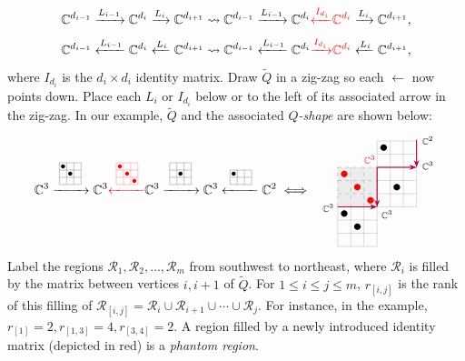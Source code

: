 \documentclass[12pt]{amsart}
\newcommand{\quivermatrix}[3]{
\scalebox{0.8}{
\begin{tikzpicture}[baseline=-0.5ex]
  \draw[line width=.2pt, step=.25cm] (0,0) grid (#1,#2);
  #3
\end{tikzpicture}
}
}
\newcommand{\cell}{.28}
\newcommand{\tile}[5]{%
\begin{scope}[shift={(#1,#2)}]
  \draw[line width =.1pt, step=\cell] (0,0) grid ({#3*\cell},{#4*\cell});
  #5
\end{scope}
}
\newcommand{\phantomtile}[5]{%
\begin{scope}[shift={(#1,#2)}]
  \fill[gray!15] (0,0) rectangle ({#3*\cell},{#4*\cell});
  \draw[gray!70, dashed, step=\cell] (0,0) grid ({#3*\cell},{#4*\cell});
  #5
\end{scope}
}
\newcommand{\dotcell}[2]{%
  \fill ({(#1+.5)*\cell},{(2.5-#2)*\cell}) circle (2pt);
}
\theoremstyle{definition}
\theoremstyle{remark}
\begin{document}
\[{\mathbb C}^{d_{i-1}} \xrightarrow{L_{i-1}} {\mathbb C}^{d_{i}}
 \xrightarrow{L_i}
 {\mathbb C}^{d_{i+1}} \leadsto
 {\mathbb C}^{d_{i-1}} \xrightarrow{L_{i-1}} {\mathbb C}^{d_{i}}
 {\color{red}{\xleftarrow{I_{d_i}}} {\mathbb C}^{d_i}} \xrightarrow{L_{i}} 
 {\mathbb C}^{d_{i+1}}, 
 \]
 \[{\mathbb C}^{d_{i-1}} \xleftarrow{L_{i-1}} {\mathbb C}^{d_{i}}
 \xleftarrow{L_i}
 {\mathbb C}^{d_{i+1}} \leadsto
 {\mathbb C}^{d_{i-1}} \xleftarrow{L_{i-1}} {\mathbb C}^{d_{i}}
 {\color{red}{\xrightarrow{I_{d_i}}} {\mathbb C}^{d_i}} \xleftarrow{L_{i}} 
 {\mathbb C}^{d_{i+1}}, 
 \]
where $I_{d_i}$ is the $d_i\times d_i$ identity matrix. Draw $\widetilde Q$ in a zig-zag 
so  each $\leftarrow$ now points down. Place each $L_i$ or $I_{d_i}$ 
below or to the left of its associated arrow in the zig-zag. In our example, $\widetilde Q$ and the associated
\emph{$Q$-shape} are shown below:
\[
{\mathbb C}^3 
\xrightarrow{
\quivermatrix{.75}{.75}{
  \fill (.125,.625) circle (2pt);
  \fill (.375,.375) circle (2pt);
}}
{\mathbb C}^3 {\color{red}{\xleftarrow{ 
\quivermatrix{.75}{.75}{
 \fill (.125,.625) circle (2pt);
  \fill (.375,.375) circle (2pt);
  \fill (.625,.125) circle (2pt);
 }}}}
 {\mathbb C}^3 \xrightarrow{
 \quivermatrix{.75}{.75}{
  \fill (.375,.375) circle (2pt);
}
 } {\mathbb C}^3
\xleftarrow{
\quivermatrix{.75}{.5}{
  \fill (.125,.375) circle (2pt);
}
} {\mathbb C}^2
\iff
\vcenter{\hbox{
\begin{tikzpicture}[scale=1.3, baseline=-.5ex]

\tile{0}{0}{3}{3}{
  \dotcell{0}{0}
  \dotcell{1}{1}
}

{\color{red}{\phantomtile{0}{.84}{3}{3}{
  \dotcell{0}{0}
  \dotcell{1}{1}
  \dotcell{2}{2}
}}}

\tile{.84}{.84}{3}{3}{
  \dotcell{1}{1}
}

\tile{.84}{1.68}{3}{2}{
  \dotcell{0}{1}
}

\draw[purple, -{Stealth[length=2mm,width=1.5mm]}, thick] (0,.84) -- (.84,.84);
\draw[purple, -{Stealth[length=2mm,width=1.5mm]}, thick] (.84,1.68) -- (.84,.84);
\draw[purple, -{Stealth[length=2mm,width=1.5mm]}, thick] (.84,1.68) -- (1.68,1.68);
\draw[purple, -{Stealth[length=2mm,width=1.5mm]}, thick] (1.68,2.27) -- (1.68,1.68);

\node at (-.2,.82) {\scriptsize ${\mathbb C}^3$};
\node at (1.05,.68) {\scriptsize ${\mathbb C}^3$};
\node at (0.68,1.85) {\scriptsize {\color{red}{${\mathbb C}^3$}}};
\node at (1.92,1.72) {\scriptsize ${\mathbb C}^3$};
\node at (1.92,2.25) {\scriptsize ${\mathbb C}^2$};
\end{tikzpicture}}}
\]
Label the regions ${\mathcal R}_1,{\mathcal R}_2,\ldots, {\mathcal R}_{m}$ from southwest to northeast, where ${\mathcal R}_i$
is filled by the matrix between vertices $i,i+1$ of ${\widetilde Q}$.
For $1\leq i\leq j\leq m$,  $r_{[i,j]}$ is the rank of this filling of
${\mathcal R}_{[i,j]}={\mathcal R}_i \cup {\mathcal R}_{i+1} \cup \cdots \cup {\mathcal R}_j$. For instance, in the example, $r_{[1]}=2, r_{[1,3]}=4, r_{[3,4]}=2$.
A region filled by a newly introduced identity matrix (depicted in red) is a
\emph{phantom region}.
\end{document}
